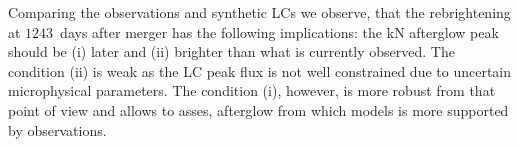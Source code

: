 %


Comparing the \GRB{} observations and synthetic \acp{LC} we observe, that the 
rebrightening at $1243$~days after merger has the following implications:
the \ac{kN} afterglow peak should be (i) later and (ii) brighter than what is
currently observed. 
%
The condition (ii) is weak as the \ac{LC} peak flux is not well constrained due to 
uncertain microphysical parameters.
The condition (i), however, is more robust from that point of view and allows to 
asses, afterglow from which models is more supported by observations.

